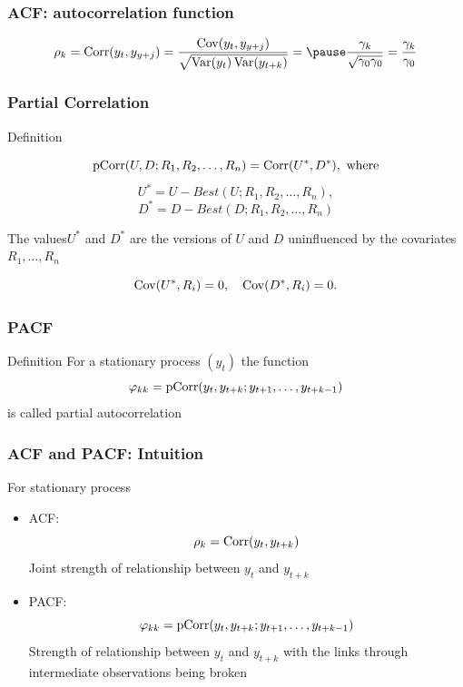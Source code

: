 \begin{frame}
\frametitle{ACF: autocorrelation function}
	
	\[
	\rho_k = \Corr(y_t, y_{y+j}) = \frac{\Cov(y_t, y_{y+j})}{\sqrt{\Var(y_t)\Var(y_{t+k})}} =  \pause
	\frac{\gamma_k}{\sqrt{\gamma_0 \gamma_0 }} = \frac{\gamma_k}{\gamma_0}
	\]  
	
\end{frame}




\begin{frame}
	\frametitle{Partial Correlation}
	
	\begin{block}{Definition}
		
		\[
		\operatorname{pCorr}(U, D ; R_1, R_2, \ldots, R_n) = \operatorname{Corr}(U^*, D^*), \text{ where} 
		\]
		\[
		U^* = U - Best(U; R_1, R_2, \ldots, R_n), 
		\]
		\[
		D^* = D - Best(D; R_1, R_2, \ldots, R_n)
		\]    
	\end{block}
	
	\pause
	The values ​​$U^*$ and $D^*$ are the versions of $U$ and $D$ \alert{uninfluenced}  by the covariates $R_1, \ldots, R_n$
	
	\[
	\operatorname{Cov}(U^*, R_i) = 0, \quad \operatorname{Cov}(D^*, R_i) = 0.
	\]
	
\end{frame}


	
	\begin{frame}
		\frametitle{PACF}
		
		\begin{block}{Definition}
			For a stationary process $(y_t)$ the function
			\[
			\varphi_{kk} = \operatorname{pCorr}(y_t, y_{t+k}; y_{t+1}, \ldots, y_{t+k-1})
			\]
			is called \alert{partial autocorrelation}
		\end{block}
	\end{frame}
	
	\begin{frame}
		\frametitle{ACF and PACF: Intuition}
		
		For \alert{stationary process}
		
		\begin{itemize}
			\item ACF:
			\[
			\rho_k = \operatorname{Corr}(y_t, y_{t+k})
			\]
			\alert{Joint strength} of relationship between $y_t$ and $y_{t+k}$
			\item PACF:
			\[
			\varphi_{kk} = \operatorname{pCorr}(y_t, y_{t+k}; y_{t+1}, \ldots, y_{t+k-1})
			\]
			\alert{Strength} of relationship  between  $y_t$ and $y_{t+k}$ with the links through intermediate observations being  \alert{broken}
		\end{itemize}
	\end{frame}
	
